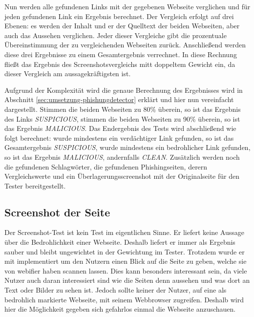 Nun werden alle gefundenen Links mit der gegebenen Webseite verglichen und für jeden gefundenen Link ein Ergebnis berechnet. Der Vergleich erfolgt auf drei Ebenen: es werden der Inhalt und er der Quelltext der beiden Webseiten, aber auch das Aussehen verglichen. Jeder dieser Vergleiche gibt die prozentuale Übereinstimmung der zu vergleichenden Webseiten zurück. Anschließend werden diese drei Ergebnisse zu einem Gesamtergebnis verrechnet. In diese Rechnung fließt das Ergebnis des Screenshotsvergleichs mitt doppeltem Gewicht ein, da dieser Vergleich am aussagekräftigsten ist.

Aufgrund der Komplexität wird die genaue Berechnung des Ergebnisses wird in Abschnitt \ref{sec:umsetzung-phishungdetector} erklärt und hier nun vereinfacht dargestellt. Stimmen die beiden Webseiten zu 80\% überein, so ist das Ergebnis des Links \textit{SUSPICIOUS}, stimmen die beiden Webseiten zu 90\% überein, so ist das Ergebnis \textit{MALICIOUS}. Das Endergebnis des Tests wird abschließend wie folgt berechnet: wurde mindestens ein verdächtiger Link gefunden, so ist das Gesamtergebnis \textit{SUSPICIOUS}, wurde mindestens ein bedrohlicher Link gefunden, so ist das Ergebnis \textit{MALICIOUS}, andernfalls \textit{CLEAN}. Zusätzlich werden noch die gefundenen Schlagwörter, die gefundenen Phishingseiten, derern Vergleichswerte und ein Überlagerungsscreenshot mit der Originalseite für den Tester bereitgestellt.

\subsection{Screenshot der Seite}
Der Screenshot-Test ist kein Test im eigentlichen Sinne. Er liefert keine Aussage über die Bedrohlichkeit einer Webseite. Deshalb liefert er immer als Ergebnis sauber und bleibt ungewichtet in der Gewichtung im Tester. Trotzdem wurde er mit implementiert um den Nutzern einen Blick auf die Seite zu geben, welche sie von webifier haben scannen lassen. Dies kann besonders interessant sein, da viele Nutzer auch daran interessiert sind wie die Seiten denn aussehen und was dort an Text oder Bilder zu sehen ist. Jedoch sollte keiner der Nutzer, auf eine als bedrohlich markierte Webseite, mit seinem Webbrowser zugreifen. Deshalb wird hier die Möglichkeit gegeben sich gefahrlos einmal die Webseite anzuschauen.
